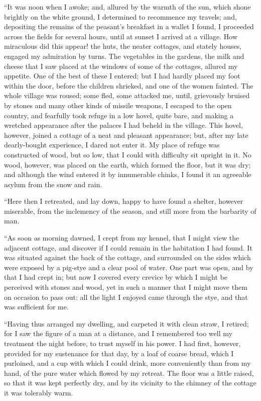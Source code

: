 ``It was noon when I awoke; and,
allured by the warmth of the sun, which
shone brightly on the white ground, I
determined to recommence my travels;
and, depositing the remains of the peasant's
breakfast in a wallet I found, I
proceeded across the fields for several
hours, until at sunset I arrived at a
village. How miraculous did this appear!
the huts, the neater cottages, and
stately houses, engaged my admiration
by turns. The vegetables in the gardens,
the milk and cheese that I saw
placed at the windows of some of the
cottages, allured my appetite. One of
the best of these I entered; but I had
hardly placed my foot within the door,
before the children shrieked, and one
of the women fainted. The whole village
was roused; some fled, some attacked
me, until, grievously bruised by
stones and many other kinds of missile
weapons, I escaped to the open country,
and fearfully took refuge in a low
hovel, quite bare, and making a wretched
appearance after the palaces I had
beheld in the village. This hovel,
however, joined a cottage of a neat and
pleasant appearance; but, after my late
dearly-bought experience, I dared not
enter it. My place of refuge was constructed
of wood, but so low, that I
could with difficulty sit upright in it.
No wood, however, was placed on the
earth, which formed the floor, but it
was dry; and although the wind entered
it by innumerable chinks, I found
it an agreeable asylum from the snow
and rain.

``Here then I retreated, and lay
down, happy to have found a shelter,
however miserable, from the inclemency
of the season, and still more from the
barbarity of man.

``As soon as morning dawned, I
crept from my kennel, that I might view
the adjacent cottage, and discover if I
could remain in the habitation I had
found. It was situated against the back
of the cottage, and surrounded on the
sides which were exposed by a pig-stye
and a clear pool of water. One part was
open, and by that I had crept in; but
now I covered every crevice by which I
might be perceived with stones and
wood, yet in such a manner that I
might move them on occasion to pass
out: all the light I enjoyed came
through the stye, and that was sufficient
for me.

``Having thus arranged my dwelling,
and carpeted it with clean straw, I
retired; for I saw the figure of a man
at a distance, and I remembered too
well my treatment the night before, to
trust myself in his power. I had first,
however, provided for my sustenance
for that day, by a loaf of coarse bread,
which I purloined, and a cup with
which I could drink, more conveniently
than from my hand, of the pure water
which flowed by my retreat. The floor
was a little raised, so that it was kept
perfectly dry, and by its vicinity to the
chimney of the cottage it was tolerably
warm.

